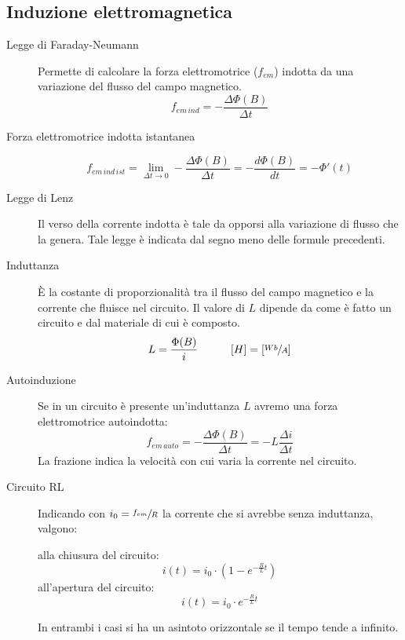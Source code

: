 \documentclass[a4paper,11pt,italian]{article}
\begin{document}
\subsection{Induzione elettromagnetica}

\begin{description}
  \item[Legge di Faraday-Neumann] 
  Permette di calcolare la forza elettromotrice ($ f_{em} $) indotta da una variazione del flusso del campo magnetico.
  \[ f_{em \, ind} =  - \frac{\Delta \Phi(B)}{\Delta t} \]
  
  \item[Forza elettromotrice indotta istantanea] 
  \[ f_{em \, ind \, ist} =  \lim_{\Delta t \rightarrow 0}- \frac{\Delta \Phi(B)}{\Delta t} = - \frac{d\Phi(B)}{dt} = - \Phi'(t) \]
  
  \item[Legge di Lenz] 
  Il verso della corrente indotta è tale da opporsi alla variazione di flusso che la genera. Tale legge è indicata dal segno meno delle formule precedenti.
  
  \item[Induttanza] 
  È la costante di proporzionalità tra il flusso del campo magnetico e la corrente che fluisce nel circuito. Il valore di $ L $ dipende da come è fatto un circuito e dal materiale di cui è composto.
  \[ L =  \frac{\Phi(B)}{i} \hspace*{3em} [H] = \left[ \sfrac{Wb}{A} \right] \]
  
  \item[Autoinduzione] 
  Se in un circuito è presente un'induttanza $ L $ avremo una forza elettromotrice autoindotta:
  \[ f_{em \, auto} =  - \frac{\Delta \Phi(B)}{\Delta t} = - L \frac{\Delta i}{\Delta t} \]La frazione indica la velocità con cui varia la corrente nel circuito.
  
  \item[Circuito RL] 
  Indicando con $ i_0 = \sfrac{f_{em}}{R} $ la corrente che si avrebbe senza induttanza, valgono:

\begin{multicols}{2}
\begin{center}
alla chiusura del circuito:
\[ i(t) = i_0 \cdot \left( 1 - e^{-\frac{R}{L}t} \right) \]
all'apertura del circuito:
\[ i(t) = i_0 \cdot e^{-\frac{R}{L}t} \]
\end{center}
\end{multicols}
  In entrambi i casi si ha un asintoto orizzontale se il tempo tende a infinito.


\end{description}
\end{document}
